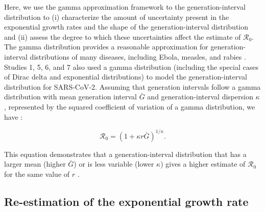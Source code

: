 \documentclass[12pt]{article}
\newcommand{\Ro}{\ensuremath{{\mathcal R}_{0}}\xspace}
\begin{document}
Here, we use the gamma approximation framework to the generation-interval distribution \citep{nishiura2009transmission, mcbryde2009early, roberts2011early, trichereau2012estimation, nishiura2015theoretical, park2019practical} to (i) characterize the amount of uncertainty present in the exponential growth rates and the shape of the generation-interval distribution and (ii) assess the degree to which these uncertainties affect the estimate of \Ro.
The gamma distribution provides a reasonable approximation for generation-interval distributions of many diseases, including Ebola, measles, and rabies \citep{park2019practical}.
Studies 1, 5, 6, and 7 also used a gamma distribution (including the special cases of Dirac delta and exponential distributions) to model the generation-interval distribution for SARS-CoV-2.
Assuming that generation intervals follow a gamma distribution with mean generation interval $\bar G$ and generation-interval dispersion $\kappa$, represented by the squared coefficient of variation of a gamma distribution, we have \citep{park2019practical}:
\begin{linenomath*}
\begin{equation}
\Ro = \left(1 + \kappa r \bar{G}\right)^{1/\kappa}.
\label{eq:gamma}
\end{equation}
\end{linenomath*}
This equation demonstrates that a generation-interval distribution that has a larger mean (higher $\bar{G}$) or is less variable (lower $\kappa$) gives a higher estimate of \Ro for the same value of $r$ \citep{wallinga2007generation}.

\subsection{Re-estimation of the exponential growth rate}
\end{document}
